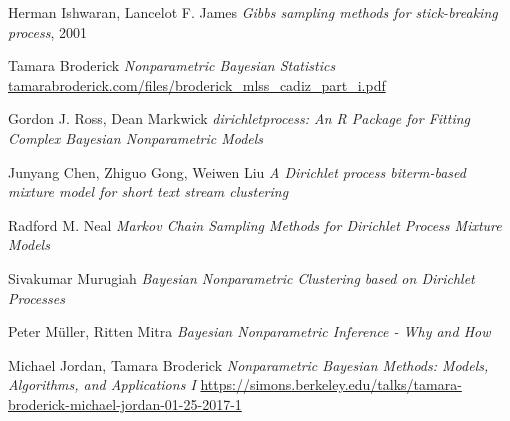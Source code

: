 \documentclass[12pt,a4paper]{article}
\begin{document}
\begin{thebibliography}{9}
Herman Ishwaran, Lancelot F. James \emph{Gibbs sampling methods for stick-breaking process}, 2001

Tamara Broderick \emph{Nonparametric Bayesian Statistics} \url{tamarabroderick.com/files/broderick_mlss_cadiz_part_i.pdf}

Gordon J. Ross, Dean Markwick \emph{dirichletprocess: An R Package for Fitting Complex Bayesian Nonparametric Models}

Junyang Chen, Zhiguo Gong, Weiwen Liu \emph{A Dirichlet process biterm-based mixture model for short text stream clustering}

Radford M. Neal \emph{Markov Chain Sampling Methods for Dirichlet Process Mixture Models}

Sivakumar Murugiah \emph{Bayesian Nonparametric Clustering based on Dirichlet Processes}

Peter Müller, Ritten Mitra \emph{Bayesian Nonparametric Inference - Why and How}

Michael Jordan, Tamara Broderick \emph{Nonparametric Bayesian Methods: Models, Algorithms, and Applications I} \url{https://simons.berkeley.edu/talks/tamara-broderick-michael-jordan-01-25-2017-1}

\end{thebibliography}
\end{document}
